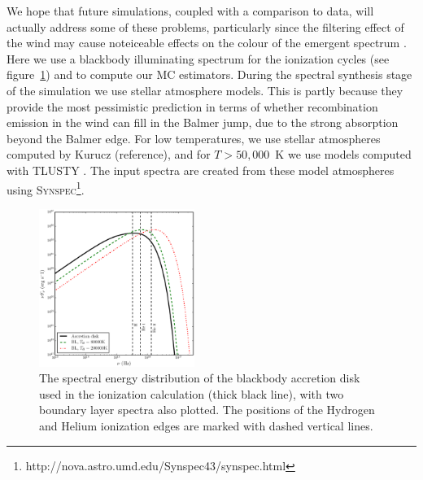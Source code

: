 \documentclass[preprint, a4paper, 11pt]{aastex}
\begin{document}
We hope that future simulations, coupled with a comparison to data, will 
actually address some of these problems, particularly since
the filtering effect of the wind may cause noteiceable effects
on the colour of the emergent spectrum \citep{hassall}. 
Here we use a blackbody illuminating spectrum
for the ionization cycles (see figure~\ref{sed}) and to compute our MC estimators.
During the spectral synthesis stage of the simulation we use stellar atmosphere models.
This is partly because they provide the most pessimistic prediction in terms of whether recombination emission in the 
wind can fill in the Balmer jump, due to the strong absorption beyond the Balmer edge.
For low temperatures, we use stellar atmospheres computed 
by Kurucz (reference), and for $T>50,000$~K we use models computed with 
\textsc{TLUSTY} \citep{tlusty}. The input spectra are created from these model
atmospheres using \textsc{Synspec}\footnote{http://nova.astro.umd.edu/Synspec43/synspec.html}.

\begin{figure}
\centering
\includegraphics[width=0.45\textwidth]{figures/sed_figure.eps}
\caption{
The spectral energy distribution of the blackbody accretion
disk used in the ionization calculation (thick black line), 
with two boundary layer spectra also plotted.
The positions of the Hydrogen and Helium ionization edges 
are marked with dashed vertical lines.
}
\label{sed}
\end{figure}
\end{document}
